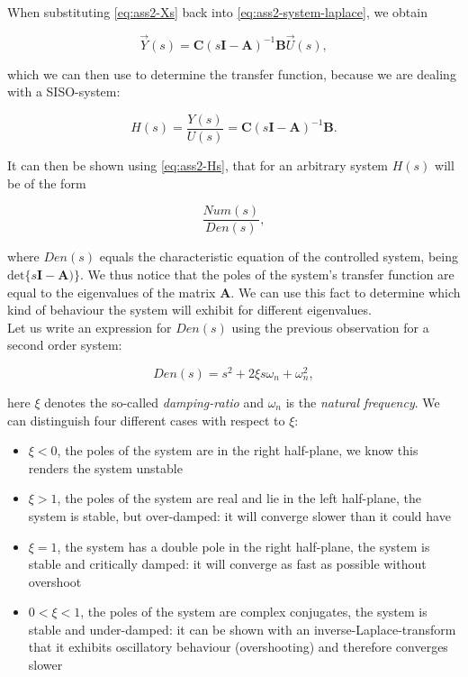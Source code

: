 \documentclass[11pt,titlepage]{report}
\begin{document}
When substituting \ref{eq:ass2-Xs} back into \ref{eq:ass2-system-laplace}, we obtain

\begin{equation*}
	\vec{Y}(s) = \mathbf{C}(s\mathbf{I} - \mathbf{A})^{-1}\mathbf{B}\vec{U}(s),
\end{equation*}

which we can then use to determine the transfer function, because we are dealing with a SISO-system:

\begin{equation}
	H(s) = \frac{Y(s)}{U(s)} = \mathbf{C}(s\mathbf{I} - \mathbf{A})^{-1}\mathbf{B}.
	\label{eq:ass2-Hs}
\end{equation}

It can then be shown using \ref{eq:ass2-Hs}, that for an arbitrary system $H(s)$ will be of the form

\begin{equation}
	\frac{Num(s)}{Den(s)},
\end{equation}

where $Den(s)$ equals the characteristic equation of the controlled system, being $\mathrm{det}\{s\mathbf{I}-\mathbf{A})\}$. We thus notice that the poles of the system's transfer function are equal to the eigenvalues of the matrix $\mathbf{A}$. We can use this fact to determine which kind of behaviour the system will exhibit for different eigenvalues. \\
Let us write an expression for $Den(s)$ using the previous observation for a second order system:

\begin{equation}
	Den(s) = s^2 + 2\xi s \omega_n + \omega_n^2,
\end{equation}

here $\xi$ denotes the so-called \textit{damping-ratio} and $\omega_n$ is the \textit{natural frequency}. We can distinguish four different cases with respect to $\xi$:

\begin{itemize}
	\item $\xi < 0$, the poles of the system are in the right half-plane, we know this renders the system unstable
	\item $\xi > 1$, the poles of the system are real and lie in the left half-plane, the system is stable, but over-damped: it will converge slower than it could have
	\item $\xi = 1$, the system has a double pole in the right half-plane, the system is stable and critically damped: it will converge as fast as possible without overshoot
	\item $0 < \xi < 1$, the poles of the system are complex conjugates, the system is stable and under-damped: it can be shown with an inverse-Laplace-transform that it exhibits oscillatory behaviour (overshooting) and therefore converges slower
\end{itemize}
\cite{transient-systems}
\end{document}
